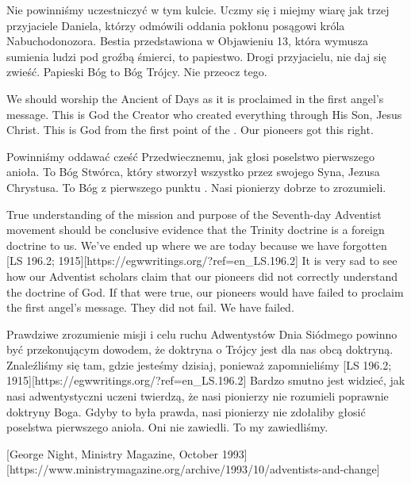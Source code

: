 Nie powinniśmy uczestniczyć w tym kulcie. Uczmy się i miejmy wiarę jak trzej przyjaciele Daniela, którzy odmówili oddania pokłonu posągowi króla Nabuchodonozora. Bestia przedstawiona w Objawieniu 13, która wymusza sumienia ludzi pod groźbą śmierci, to papiestwo. Drogi przyjacielu, nie daj się zwieść. Papieski Bóg to Bóg Trójcy. Nie przeocz tego.


We should worship the Ancient of Days as it is proclaimed in the first angel’s message. This is God the Creator who created everything through His Son, Jesus Christ. This is God from the first point of the . Our pioneers got this right.


Powinniśmy oddawać cześć Przedwiecznemu, jak głosi poselstwo pierwszego anioła. To Bóg Stwórca, który stworzył wszystko przez swojego Syna, Jezusa Chrystusa. To Bóg z pierwszego punktu . Nasi pionierzy dobrze to zrozumieli.


True understanding of the mission and purpose of the Seventh-day Adventist movement should be conclusive evidence that the Trinity doctrine is a foreign doctrine to us. We’ve ended up where we are today because we have forgotten [LS 196.2; 1915][https://egwwritings.org/?ref=en\_LS.196.2] It is very sad to see how our Adventist scholars claim that our pioneers did not correctly understand the doctrine of God. If that were true, our pioneers would have failed to proclaim the first angel's message. They did not fail. We have failed.


Prawdziwe zrozumienie misji i celu ruchu Adwentystów Dnia Siódmego powinno być przekonującym dowodem, że doktryna o Trójcy jest dla nas obcą doktryną. Znaleźliśmy się tam, gdzie jesteśmy dzisiaj, ponieważ zapomnieliśmy [LS 196.2; 1915][https://egwwritings.org/?ref=en\_LS.196.2] Bardzo smutno jest widzieć, jak nasi adwentystyczni uczeni twierdzą, że nasi pionierzy nie rozumieli poprawnie doktryny Boga. Gdyby to była prawda, nasi pionierzy nie zdołaliby głosić poselstwa pierwszego anioła. Oni nie zawiedli. To my zawiedliśmy.


[George Night, Ministry Magazine, October 1993][https://www.ministrymagazine.org/archive/1993/10/adventists-and-change]


